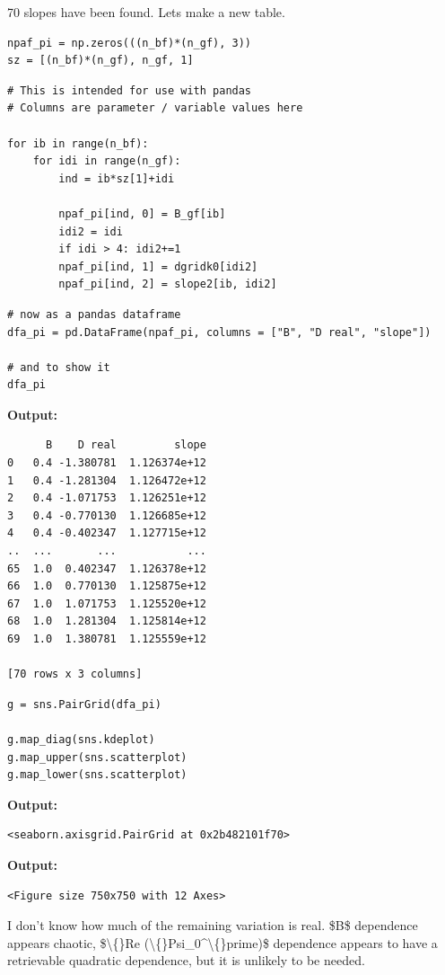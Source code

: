 \documentclass{article}
\begin{document}
70 slopes have been found. Lets make a new table.

\begin{lstlisting}
npaf_pi = np.zeros(((n_bf)*(n_gf), 3))
sz = [(n_bf)*(n_gf), n_gf, 1]\end{lstlisting}

\begin{lstlisting}
# This is intended for use with pandas
# Columns are parameter / variable values here

for ib in range(n_bf):
    for idi in range(n_gf):
        ind = ib*sz[1]+idi
        
        npaf_pi[ind, 0] = B_gf[ib]
        idi2 = idi
        if idi > 4: idi2+=1
        npaf_pi[ind, 1] = dgridk0[idi2]
        npaf_pi[ind, 2] = slope2[ib, idi2]\end{lstlisting}

\begin{lstlisting}
# now as a pandas dataframe
dfa_pi = pd.DataFrame(npaf_pi, columns = ["B", "D real", "slope"])

# and to show it
dfa_pi\end{lstlisting}

\textbf{Output:}\begin{verbatim}
      B    D real         slope
0   0.4 -1.380781  1.126374e+12
1   0.4 -1.281304  1.126472e+12
2   0.4 -1.071753  1.126251e+12
3   0.4 -0.770130  1.126685e+12
4   0.4 -0.402347  1.127715e+12
..  ...       ...           ...
65  1.0  0.402347  1.126378e+12
66  1.0  0.770130  1.125875e+12
67  1.0  1.071753  1.125520e+12
68  1.0  1.281304  1.125814e+12
69  1.0  1.380781  1.125559e+12

[70 rows x 3 columns]
\end{verbatim}

\begin{lstlisting}
g = sns.PairGrid(dfa_pi)

g.map_diag(sns.kdeplot)
g.map_upper(sns.scatterplot)
g.map_lower(sns.scatterplot)\end{lstlisting}

\textbf{Output:}\begin{verbatim}
<seaborn.axisgrid.PairGrid at 0x2b482101f70>
\end{verbatim}

\textbf{Output:}\begin{verbatim}
<Figure size 750x750 with 12 Axes>
\end{verbatim}

I don't know how much of the remaining variation is real. \$B\$ dependence appears chaotic, \$\textbackslash\{\}Re (\textbackslash\{\}Psi\_0\textasciicircum{}\textbackslash\{\}prime)\$ dependence appears to have a retrievable quadratic dependence, but it is unlikely to be needed. 
\end{document}
